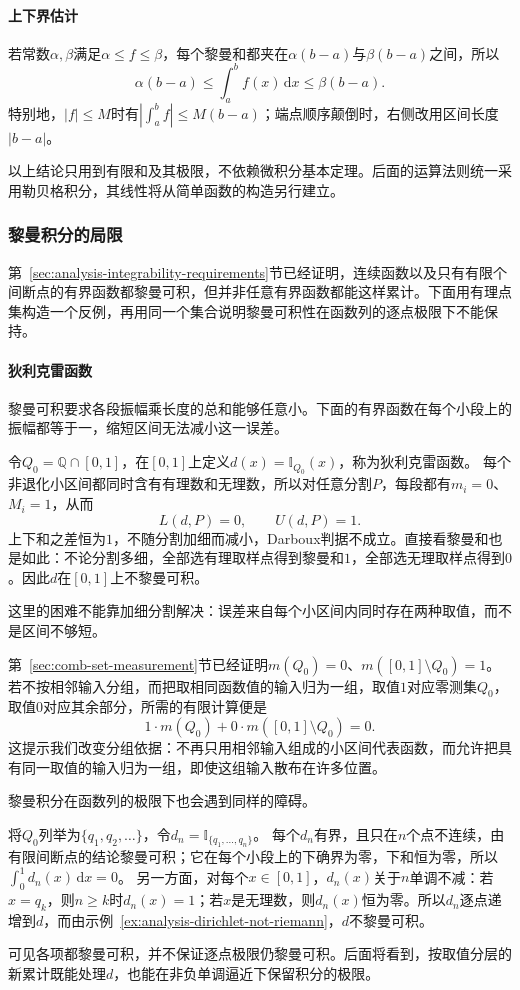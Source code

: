 \paragraph{上下界估计}
若常数$\alpha,\beta$满足$\alpha\leq f\leq\beta$，每个黎曼和都夹在$\alpha(b-a)$与$\beta(b-a)$之间，所以
\[
 \alpha(b-a)\leq\int_a^bf(x)\,\mathrm dx\leq\beta(b-a).
\]
特别地，$|f|\leq M$时有$|\int_a^bf|\leq M(b-a)$；端点顺序颠倒时，右侧改用区间长度$|b-a|$。

以上结论只用到有限和及其极限，不依赖微积分基本定理。后面的运算法则统一采用勒贝格积分，其线性将从简单函数的构造另行建立。

\subsubsection{黎曼积分的局限}

第~\ref{sec:analysis-integrability-requirements}节已经证明，连续函数以及只有有限个间断点的有界函数都黎曼可积，但并非任意有界函数都能这样累计。下面用有理点集构造一个反例，再用同一个集合说明黎曼可积性在函数列的逐点极限下不能保持。


\paragraph{狄利克雷函数}
黎曼可积要求各段振幅乘长度的总和能够任意小。下面的有界函数在每个小段上的振幅都等于一，缩短区间无法减小这一误差。
\begin{example}[狄利克雷函数不黎曼可积]
\label{ex:analysis-dirichlet-not-riemann}
令$Q_0=\mathbb Q\cap[0,1]$，在$[0,1]$上定义$d(x)=\mathbb I_{Q_0}(x)$，称为狄利克雷函数。
每个非退化小区间都同时含有有理数和无理数，所以对任意分割$P$，每段都有$m_i=0$、$M_i=1$，从而
\[
 L(d,P)=0,\qquad U(d,P)=1.
\]
上下和之差恒为$1$，不随分割加细而减小，Darboux判据不成立。直接看黎曼和也是如此：不论分割多细，全部选有理取样点得到黎曼和$1$，全部选无理取样点得到$0$。因此$d$在$[0,1]$上不黎曼可积。
\end{example}
这里的困难不能靠加细分割解决：误差来自每个小区间内同时存在两种取值，而不是区间不够短。

第~\ref{sec:comb-set-measurement}节已经证明$m(Q_0)=0$、$m([0,1]\setminus Q_0)=1$。若不按相邻输入分组，而把取相同函数值的输入归为一组，取值$1$对应零测集$Q_0$，取值$0$对应其余部分，所需的有限计算便是
\[
 1\cdot m(Q_0)+0\cdot m([0,1]\setminus Q_0)=0.
\]
这提示我们改变分组依据：不再只用相邻输入组成的小区间代表函数，而允许把具有同一取值的输入归为一组，即使这组输入散布在许多位置。

黎曼积分在函数列的极限下也会遇到同样的障碍。
\begin{example}[有限点指示函数递增到狄利克雷函数]
\label{ex:analysis-finite-indicators-dirichlet}
将$Q_0$列举为$\{q_1,q_2,\ldots\}$，令$d_n=\mathbb I_{\{q_1,\ldots,q_n\}}$。
每个$d_n$有界，且只在$n$个点不连续，由有限间断点的结论黎曼可积；它在每个小段上的下确界为零，下和恒为零，所以$\int_0^1d_n(x)\,\mathrm dx=0$。
另一方面，对每个$x\in[0,1]$，$d_n(x)$关于$n$单调不减：若$x=q_k$，则$n\geq k$时$d_n(x)=1$；若$x$是无理数，则$d_n(x)$恒为零。所以$d_n$逐点递增到$d$，而由示例~\ref{ex:analysis-dirichlet-not-riemann}，$d$不黎曼可积。
\end{example}
可见各项都黎曼可积，并不保证逐点极限仍黎曼可积。后面将看到，按取值分层的新累计既能处理$d$，也能在非负单调逼近下保留积分的极限。

